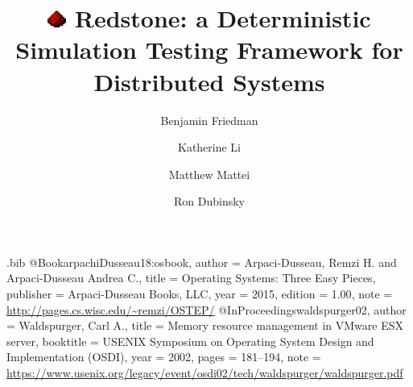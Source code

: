 \usepackage{filecontents}

\usepackage{setspace}
\linespread{1.25}

\begin{filecontents}{\jobname.bib}
@Book{arpachiDusseau18:osbook,
author =       {Arpaci-Dusseau, Remzi H. and Arpaci-Dusseau Andrea C.},
title =        {Operating Systems: Three Easy Pieces},
publisher =    {Arpaci-Dusseau Books, LLC},
year =         2015,
edition =      {1.00},
note =         {\url{http://pages.cs.wisc.edu/~remzi/OSTEP/}}
}
@InProceedings{waldspurger02,
author =       {Waldspurger, Carl A.},
title =        {Memory resource management in {VMware ESX} server},
booktitle =    {USENIX Symposium on Operating System Design and
Implementation (OSDI)},
year =         2002,
pages =        {181--194},
note =         {\url{https://www.usenix.org/legacy/event/osdi02/tech/waldspurger/waldspurger.pdf}}}
\end{filecontents}

\newcommand{\vrsdust}[1]{\includegraphics[height=#1]{redstone_dust.png}}

\newcommand{\txtrsdust}{\vrsdust{0.55cm} \hspace{0.1in}}




\date{}

\title{\Large \bf \vrsdust{0.7cm} \hspace{0.1in} Redstone: a Deterministic Simulation Testing Framework for Distributed Systems}

\author{
{\rm Benjamin Friedman}\\
\and
{\rm Katherine Li}\\
\and
{\rm Matthew Mattei}\\
\and
{\rm Ron Dubinsky}\\
} %

